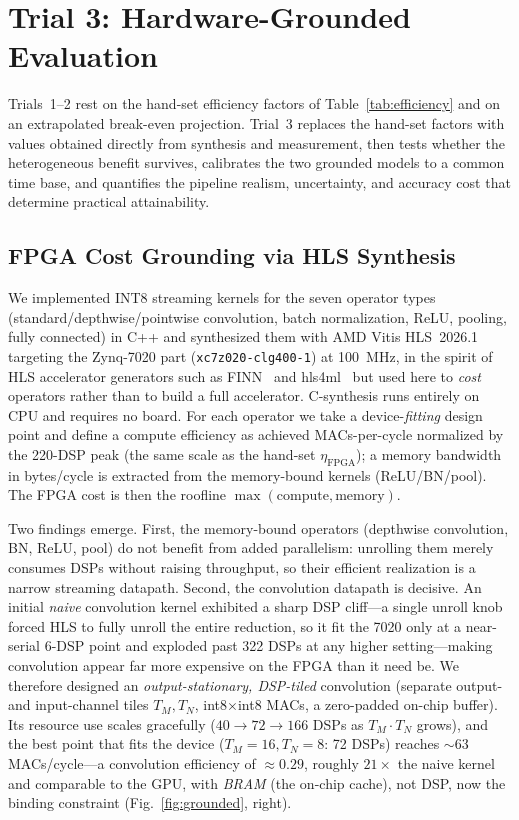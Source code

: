 \documentclass[runningheads]{llncs}
\begin{document}
\section{Trial 3: Hardware-Grounded Evaluation}\label{sec:grounded}

Trials~1--2 rest on the hand-set efficiency factors of Table~\ref{tab:efficiency} and on an extrapolated break-even projection. Trial~3 replaces the hand-set factors with values obtained directly from synthesis and measurement, then tests whether the heterogeneous benefit survives, calibrates the two grounded models to a common time base, and quantifies the pipeline realism, uncertainty, and accuracy cost that determine practical attainability.

\subsection{FPGA Cost Grounding via HLS Synthesis}\label{sec:hls}

We implemented INT8 streaming kernels for the seven operator types (standard/depthwise/pointwise convolution, batch normalization, ReLU, pooling, fully connected) in C++ and synthesized them with AMD Vitis HLS~2026.1~\cite{vitishls} targeting the Zynq-7020 part (\texttt{xc7z020-clg400-1}) at 100~MHz, in the spirit of HLS accelerator generators such as FINN~\cite{finn2017} and hls4ml~\cite{hls4ml2018} but used here to \emph{cost} operators rather than to build a full accelerator. C-synthesis runs entirely on CPU and requires no board. For each operator we take a device-\emph{fitting} design point and define a compute efficiency as achieved MACs-per-cycle normalized by the 220-DSP peak (the same scale as the hand-set $\eta_{\text{FPGA}}$); a memory bandwidth in bytes/cycle is extracted from the memory-bound kernels (ReLU/BN/pool). The FPGA cost is then the roofline $\max(\text{compute}, \text{memory})$.

Two findings emerge. First, the memory-bound operators (depthwise convolution, BN, ReLU, pool) do not benefit from added parallelism: unrolling them merely consumes DSPs without raising throughput, so their efficient realization is a narrow streaming datapath. Second, the convolution datapath is decisive. An initial \emph{naive} convolution kernel exhibited a sharp DSP cliff---a single unroll knob forced HLS to fully unroll the entire reduction, so it fit the 7020 only at a near-serial 6-DSP point and exploded past 322 DSPs at any higher setting---making convolution appear far more expensive on the FPGA than it need be. We therefore designed an \emph{output-stationary, DSP-tiled} convolution (separate output- and input-channel tiles $T_M,T_N$, int8$\times$int8 MACs, a zero-padded on-chip buffer). Its resource use scales gracefully ($40\to72\to166$ DSPs as $T_M\!\cdot\!T_N$ grows), and the best point that fits the device ($T_M{=}16,T_N{=}8$: 72 DSPs) reaches $\sim$63 MACs/cycle---a convolution efficiency of $\approx0.29$, roughly $21\times$ the naive kernel and comparable to the GPU, with \emph{BRAM} (the on-chip cache), not DSP, now the binding constraint (Fig.~\ref{fig:grounded}, right).
\end{document}
